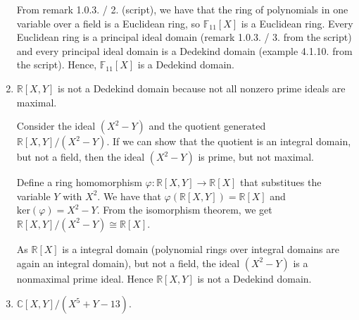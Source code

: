 \documentclass[a4paper]{article}
\theoremstyle{definition}
\begin{document}
\begin{enumerate}
    From remark 1.0.3. / 2. (script), we have that the ring of polynomials in one variable over a field is a Euclidean ring, so \(\mathbb{F}_{11}[X]\) is a Euclidean ring. Every Euclidean ring is a principal ideal domain (remark 1.0.3. / 3. from the script) and every principal ideal domain is a Dedekind domain (example 4.1.10. from the script). Hence, \(\mathbb{F}_{11}[X]\) is a Dedekind domain.
    \item \(\mathbb{R}[X, Y]\) is not a Dedekind domain because not all nonzero prime ideals are maximal.

    Consider the ideal \((X^2 - Y)\) and the quotient generated \(\mathbb{R}[X, Y] / (X^2 - Y)\). If we can show that the quotient is an integral domain, but not a field, then the ideal \((X^2 - Y)\) is prime, but not maximal.

    Define a ring homomorphism \(\varphi: \mathbb{R}[X, Y] \rightarrow \mathbb{R}[X]\) that substitues the variable \(Y\) with \(X^2\). We have that \(\varphi(\mathbb{R}[X, Y]) = \mathbb{R}[X]\) and \(\text{ker}(\varphi) = X^2 - Y\). From the isomorphism theorem, we get \(\mathbb{R}[X, Y] / (X^2 - Y) \cong \mathbb{R}[X]\).

    As \(\mathbb{R}[X]\) is a integral domain (polynomial rings over integral domains are again an integral domain), but not a field, the ideal \((X^2 - Y)\) is a nonmaximal prime ideal. Hence \(\mathbb{R}[X, Y]\) is not a Dedekind domain.
    \item \(\mathbb{C}[X, Y] / (X^5 + Y - 13)\).
\end{enumerate}
\end{document}
